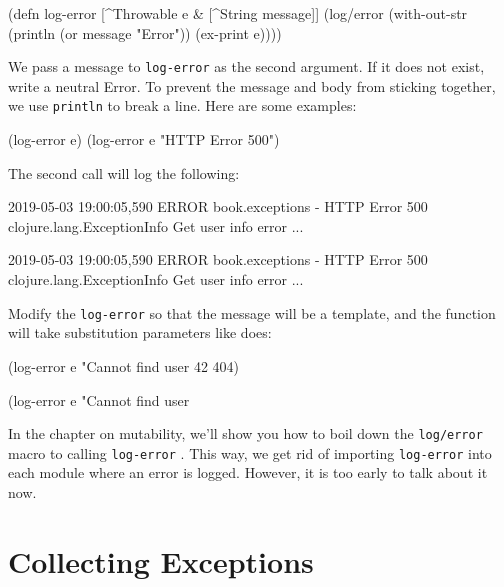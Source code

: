 \begin{clojure}
(defn log-error
  [^Throwable e & [^String message]]
  (log/error
   (with-out-str
     (println (or message "Error"))
     (ex-print e))))
\end{clojure}

We pass a message to \verb|log-error| as the second argument. If it does not exist, write a neutral Error. To prevent the message and body from sticking together, we use \verb|println| to break a line. Here are some examples:

\begin{clojure}
(log-error e)
(log-error e "HTTP Error 500")
\end{clojure}

The second call will log the following:

\ifnarrow

\begin{text}
2019-05-03 19:00:05,590 ERROR
book.exceptions - HTTP Error 500
clojure.lang.ExceptionInfo
  Get user info error
  ...
\end{text}

\else

\begin{text}
2019-05-03 19:00:05,590 ERROR book.exceptions - HTTP Error 500
clojure.lang.ExceptionInfo
  Get user info error
  ...
\end{text}

\fi

Modify the \verb|log-error| so that the message will be a template, and the function will take substitution parameters like  does:

\ifnarrow

\begin{clojure}
(log-error e
  "Cannot find user %
  42 404)
\end{clojure}

\else

\begin{clojure}
(log-error e "Cannot find user %
\end{clojure}

\fi

In the chapter on mutability, we'll show you how to boil down the \verb|log/error| macro to calling \verb|log-error| . This way, we get rid of importing \verb|log-error| into each module where an error is logged. However, it is too early to talk about it now.

\section{Collecting Exceptions}

